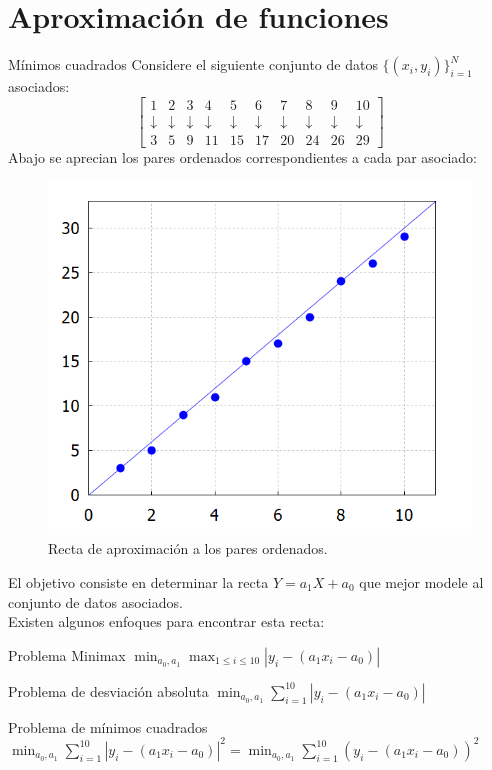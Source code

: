 \documentclass[10pt,legalpaper]{beamer}
\begin{document}
\section{Aproximación de funciones}
\begin{frame}[allowframebreaks]{Mínimos cuadrados}
Considere el siguiente conjunto de datos $\{(x_i,y_i)\}_{i=1}^{N}$ asociados:
\begin{displaymath}
\begin{bmatrix}
1&2&3&4&5&6&7&8&9&10\\
\downarrow &\downarrow &\downarrow &\downarrow &\downarrow &\downarrow &\downarrow &\downarrow &\downarrow &\downarrow\\
3&5&9&11&15&17&20&24&26&29
\end{bmatrix}
\end{displaymath}
Abajo se aprecian los pares ordenados correspondientes a cada par asociado:
\begin{figure}[H]
\includegraphics[scale=0.55]{Imagen2}
\caption{Recta de aproximación a los pares ordenados.}
\end{figure}
\indent El objetivo consiste en determinar la recta $Y=a_1X+a_0$ que mejor modele al conjunto de datos asociados.\\
\indent Existen algunos enfoques para encontrar esta recta:
\begin{block}{Problema Minimax}
\centering $\displaystyle \min_{a_0,a_1}\max_{1\leq i\leq 10}|y_i-(a_1x_i-a_0)|$
\end{block}
\begin{block}{Problema de desviación absoluta}
\centering $\displaystyle \min_{a_0,a_1}\sum_{i=1}^{10}|y_i-(a_1x_i-a_0)|$
\end{block}
\begin{block}{Problema de mínimos cuadrados}
\centering $\displaystyle \min_{a_0,a_1}\sum_{i=1}^{10}|y_i-(a_1x_i-a_0)|^2=\displaystyle \min_{a_0,a_1}\sum_{i=1}^{10}(y_i-(a_1x_i-a_0))^2$
\end{block}
\end{frame}
\end{document}
